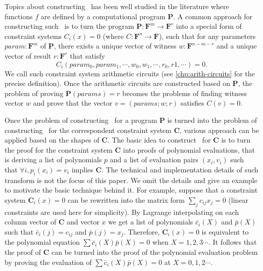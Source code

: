 \smallskip Topics about constructing \zksnark\, has been well studied in the literature \cite{groth2011efficient, groth2017snarky,groth2016size,groth2017snarky, bootle2016efficient,bunz2018bulletproofs, maller2019sonic, chiesa2020marlin,bunz2020transparent} where functions $f$ are defined by a computational program $\mathbf{P}$.
A common approach for constructing such \zksnark\, is to turn the program $\mathbf{P}:\mathbf{F}^m\rightarrow \mathbf{F}^r$ into a special form of constraint systems $C_i(x) = 0$ (where $C:\mathbf{F}^n \rightarrow \mathbf{F}$), such that for any parameters $param: \mathbf{F}^m$ of $\mathbf{P}$, there exists a unique vector of witness $w:\mathbf{F}^{n-m-r}$ and a unique vector of result $r:\mathbf{F}^r$ that satisfy
\[
C_i(param_0, param_1, \cdots, w_0, w_1, \cdots, r_0, r1, \cdots) = 0.
\]
\noindent We call such constraint system arithmetic circuits (see \ref{chp:arith-circuits} for the precise definition). Once the arithmetic circuits are constructed based on $\mathbf{P}$, the problem of proving $\mathbf{P}(params) = r$ becomes the problems of finding witness vector $w$ and prove that the vector $v = (params;w;r)$ satisfies $C(v) = 0$.

Once the problem of constructing \zksnark\, for a program $\mathbf{P}$ is turned into the problem of constructing \zksnark\, for the correspondent constraint system $\mathbf{C}$, various approach can be applied based on the shapes of $\mathbf{C}$. The basic idea to construct \zksnark\, for $\mathbf{C}$ is to turn the proof for the constraint system $\mathbf{C}$ into proofs of polynomial evaluations, that is deriving a list of polynomials $p$ and a list of evaluation pairs $(x_i,v_i)$ such that $\forall i, p_i(x_i) = v_i$ implies $\mathbf{C}$. The technical and implementation details of such transform is not the focus of this paper. We omit the details and give an example to motivate the basic technique behind it.
For example, suppose that a constraint system $\mathbf{C}_i(x) = 0$ can be rewritten into the matrix form $\sum_j c_{ij}x_j = 0$ (linear constraints are used here for simplicity). By Lagrange interpolating on each column vector of $\mathbf{C}$ and vector $x$ we get a list of polynomials $\bar{c}_i(X)$ and $\bar{p}(X)$ such that $\bar{c}_i(j) = c_{ij}$ and $\bar{p}(j) = x_j$. Therefore, $\mathbf{C}_i(x) = 0$ is equivalent to the polynomial equation $\sum \bar{c}_i(X)\bar{p}(X) = 0$ when $X =1,2,3\cdots$. It follows that the proof of $\mathbf{C}$ can be turned into the proof of the polynomial evaluation problem by proving the evaluation of $\sum \bar{c}_i(X)\bar{p}(X) = 0$ at $X=0,1,2\cdots$.

